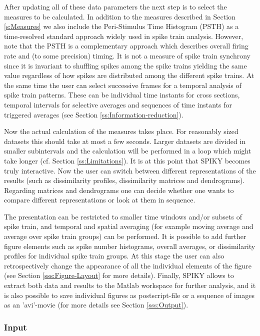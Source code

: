 \documentclass[10pt,twocolumn]{elsart5p}
\begin{document}
After updating all of these data parameters the next step is to select the measures to be calculated. In addition to the measures described in Section \ref{s:Measures} we also include the Peri-Stimulus Time Histogram (PSTH) as a time-resolved standard approach widely used in spike train analysis. However, note that the PSTH is a complementary approach which describes overall firing rate and (to some precision) timing. It is not a measure of spike train synchrony \citep{Kreuz11} since it is invariant to shuffling spikes among the spike trains yielding the same value regardless of how spikes are distributed among the different spike trains. At the same time the user can select successive frames for a temporal analysis of spike train patterns. These can be individual time instants for cross sections, temporal intervals for selective averages and sequences of time instants for triggered averages (see Section \ref{ss:Information-reduction}).

Now the actual calculation of the measures takes place. For reasonably sized datasets this should take at most a few seconds. Larger datasets are divided in smaller subintervals and the calculation will be performed in a loop which might take longer (cf. Section \ref{ss:Limitations}). It is at this point that SPIKY becomes truly interactive. Now the user can switch between different representations of the results (such as dissimilarity profiles, dissimilarity matrices and dendrograms). Regarding matrices and dendrograms one can decide whether one wants to compare different representations or look at them in sequence.

The presentation can be restricted to smaller time windows and/or subsets of spike train, and temporal and spatial averaging (for example moving average and average over spike train groups) can be performed. It is possible to add further figure elements such as spike number histograms, overall averages, or dissimilarity profiles for individual spike train groups. At this stage the user can also retrospectively change the appearance of all the individual elements of the figure (see Section \ref{sss:Figure-Layout} for more details). Finally, SPIKY allows to extract both data and results to the Matlab workspace for further analysis, and it is also possible to save individual figures as postscript-file or a sequence of images as an 'avi'-movie (for more details see Section \ref{sss:Output}).


\subsubsection{\label{sss:Input} Input}
\end{document}
